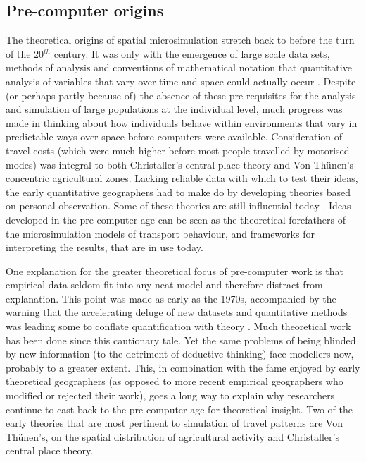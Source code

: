 \documentclass[a4paper, 11pt, twoside]{Thesis}
\begin{document}
\subsection{Pre-computer origins}
The theoretical origins of spatial microsimulation stretch back to before the
turn of the 20$^{th}$ century. It was only with the emergence of large scale
data sets, methods of analysis and conventions of mathematical notation that
quantitative analysis of variables that vary over time and space could actually
occur \citep{Ballas2009-sage}.
Despite (or perhaps partly because of) the absence of these pre-requisites for
the analysis and simulation of large populations at the individual level, much
progress was made in thinking about how individuals behave within environments
that vary in predictable ways over space before computers were available.
Consideration of travel costs (which were much higher before most
people travelled by motorised modes) was integral to both Christaller's
central place theory and Von Th\"{u}nen's concentric agricultural zones.
Lacking reliable data with which to test their ideas, the
early quantitative geographers had to make do by
developing theories based on personal observation.
Some of these theories are still influential today \citep{Clarke1985}.
Ideas developed in the pre-computer age can be seen as the theoretical
forefathers of the microsimulation models of transport behaviour, and frameworks
for interpreting the results, that are in use today.

One explanation for the greater theoretical focus of pre-computer work
is that empirical data seldom fit into any neat model and therefore
distract from explanation.
This point was made as early as the 1970s, accompanied by the
warning that the
accelerating deluge of new datasets and quantitative methods was leading some
to conflate quantification with theory \citep{Wilson1972-theoretical}.
Much theoretical work has been done since this cautionary tale. Yet the
same problems of being blinded by new information (to the detriment of
deductive thinking) face modellers now, probably to a greater extent.
This, in combination with the fame enjoyed by early theoretical geographers
(as opposed to more recent empirical geographers who modified or
rejected their work), goes a long way to explain why researchers continue to cast back to
the pre-computer age for theoretical
insight. Two of the early theories that are most pertinent to
simulation of travel patterns are Von Th\"{u}nen's, on the
spatial distribution of
agricultural activity and Christaller's central place theory.
\end{document}
